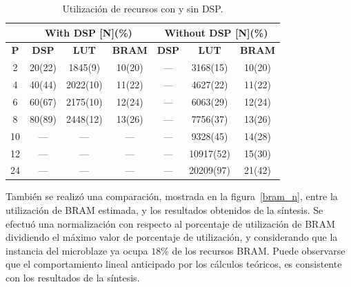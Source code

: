 \begin{table}
\renewcommand{\arraystretch}{1.3}
\caption{Utilización de recursos con y sin DSP.}
\label{res_table}
\centering
\begin{tabular}{|c|c|c|c|c|c|c|}
  \hline
  & \multicolumn{3}{c|}{\textbf{With DSP [N](\%)}} & \multicolumn{3}{c|}{\textbf{Without DSP [N](\%)}} \\ \hline
  \textbf{P}  & \textbf{DSP}            & \textbf{LUT}        & \textbf{BRAM}       & \textbf{DSP}         & \textbf{LUT}           & \textbf{BRAM}         \\ \hline
  2  & 20(22)         & 1845(9)    & 10(20)     & ---         & 3168(15)      & 10(20)         \\ \hline
  4  & 40(44)         & 2022(10)   & 11(22)     & ---         & 4627(22)      & 11(22)         \\ \hline
  6  & 60(67)         & 2175(10)   & 12(24)     & ---         & 6063(29)      & 12(24)         \\ \hline
  8  & 80(89)         & 2448(12)   & 13(26)     & ---         & 7756(37)      & 13(26)         \\ \hline
  10 & ---            & ---        & ---        & ---         & 9328(45)      & 14(28)         \\ \hline
  12 & ---            & ---        & ---        & ---         & 10917(52)     & 15(30)         \\ \hline
  24 & ---            & ---        & ---        & ---         & 20209(97)     & 21(42)         \\ \hline
\end{tabular}           
\end{table}

También se realizó una comparación, mostrada en la figura~\ref{bram_n}, entre la
utilización de BRAM estimada, y los resultados obtenidos de la síntesis. Se
efectuó una normalización con respecto al porcentaje de utilización de BRAM
dividiendo el máximo valor de porcentaje de utilización, y considerando que la
instancia del microblaze ya ocupa $18\%$ de los recursos BRAM.
Puede observarse que el comportamiento lineal anticipado por los
cálculos teóricos, es consistente con los resultados de la síntesis.

